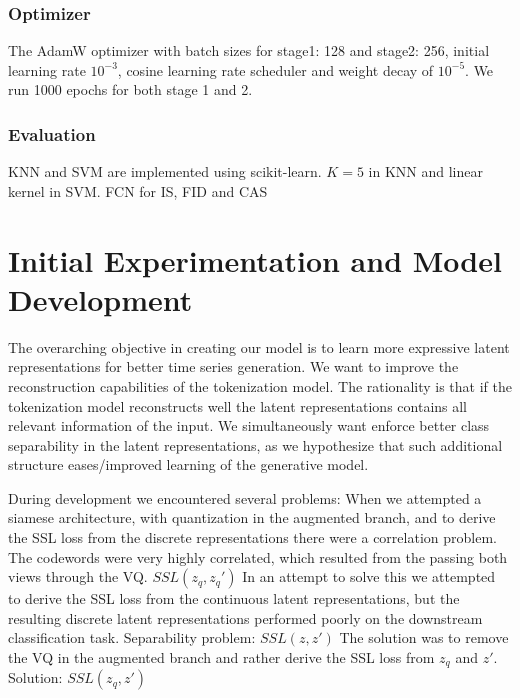 \documentclass[../../thesis.tex]{subfiles}
\begin{document}
\subsubsection{Optimizer}
The AdamW optimizer with batch sizes for stage1: 128 and stage2: 256, initial learning rate $10^{-3}$, cosine learning rate scheduler and weight decay of $10^{-5}$. We run 1000 epochs for both stage 1 and 2. 

\subsubsection{Evaluation}
KNN and SVM are implemented using scikit-learn. $K=5$ in KNN and linear kernel in SVM.\newline
FCN for IS, FID and CAS

\section{Initial Experimentation and Model Development}

The overarching objective in creating our model is to learn more expressive latent representations for better time series generation. We want to improve the reconstruction capabilities of the tokenization model. The rationality is that if the tokenization model reconstructs well the latent representations contains all relevant information of the input. We simultaneously want enforce better class separability in the latent representations, as we hypothesize that such additional structure eases/improved learning of the generative model.\newline

During development we encountered several problems:\newline
When we attempted a siamese architecture, with quantization in the augmented branch, and to derive the SSL loss from the discrete representations there were a correlation problem. The codewords were very highly correlated, which resulted from the passing both views through the VQ.  $SSL(z_q,z_q')$ \newline
In an attempt to solve this we attempted to derive the SSL loss from the continuous latent representations, but the resulting discrete latent representations performed poorly on the downstream classification task. Separability problem: $SSL(z,z')$ \newline
The solution was to remove the VQ in the augmented branch and rather derive the SSL loss from $z_q$ and $z'$. Solution: $SSL(z_q,z')$ \newline
\end{document}
